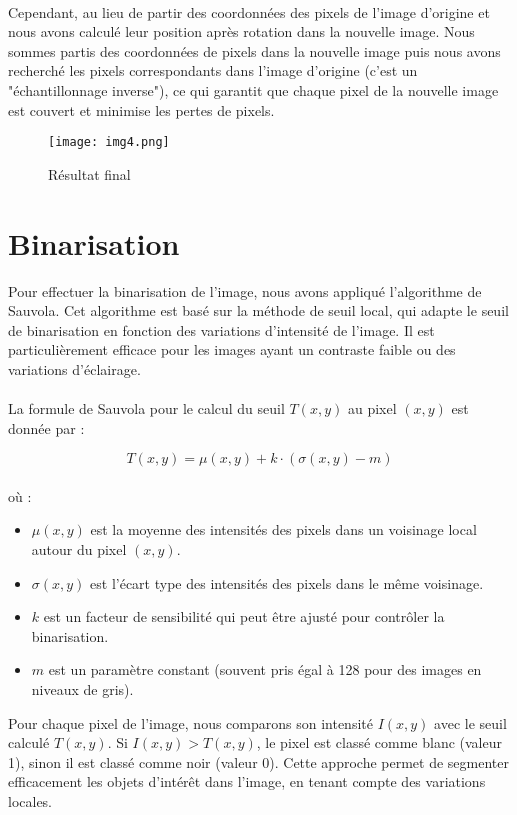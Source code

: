 \documentclass{article}
\begin{document}
\paragraph{}
Cependant, au lieu de partir des coordonnées des pixels de l'image d'origine et nous avons calculé leur position après rotation dans la nouvelle image. Nous sommes partis des coordonnées de pixels dans la nouvelle image puis nous avons recherché les pixels correspondants dans l'image d'origine (c’est un "échantillonnage inverse"), ce qui garantit que chaque pixel de la nouvelle image est couvert et minimise les pertes de pixels.
\begin{figure}[H]
    \centering
    \texttt{[image: img4.png]}
    \caption{Résultat final}
\end{figure}
\section{Binarisation}

Pour effectuer la binarisation de l'image, nous avons appliqué l'algorithme de Sauvola. Cet algorithme est basé sur la méthode de seuil local, qui adapte le seuil de binarisation en fonction des variations d'intensité de l'image. Il est particulièrement efficace pour les images ayant un contraste faible ou des variations d'éclairage.
\\\\
La formule de Sauvola pour le calcul du seuil \(T(x, y)\) au pixel \((x, y)\) est donnée par :

$$
T(x, y) = \mu(x, y) + k \cdot \left( \sigma(x, y) - m \right)
$$
\\
où :
\begin{itemize}
    \item \(\mu(x, y)\) est la moyenne des intensités des pixels dans un voisinage local autour du pixel \((x, y)\).
    \item \(\sigma(x, y)\) est l'écart type des intensités des pixels dans le même voisinage.
    \item \(k\) est un facteur de sensibilité qui peut être ajusté pour contrôler la binarisation.
    \item \(m\) est un paramètre constant (souvent pris égal à 128 pour des images en niveaux de gris).
\end{itemize}
\vspace{0.5cm}
Pour chaque pixel de l'image, nous comparons son intensité \(I(x, y)\) avec le seuil calculé \(T(x, y)\). Si \(I(x, y) > T(x, y)\), le pixel est classé comme blanc (valeur 1), sinon il est classé comme noir (valeur 0). Cette approche permet de segmenter efficacement les objets d'intérêt dans l'image, en tenant compte des variations locales.
\end{document}
